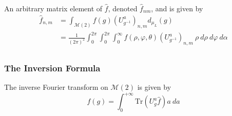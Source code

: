 \documentclass{article}
\begin{document}
\begin{define}
    An arbitrary matrix element of $\hat{f}$, denoted $\hat{f}_{nm}$, and is given by
    \[%
        \begin{split}
            \hat{f}_{n,m} &= \int_{\mathcal{M}(2)} f(g) (U^{a}_{g^{-1}})_{n,m} d_{\mu_{L}}(g)  \\
                         &= \frac{1}{(2\pi)^{2}} \int^{2\pi}_{0}\int^{2\pi}_{0}\int^{\infty}_{0} f(\rho, \varphi, \theta) (U^{a}_{g^{-1}})_{n,m} \ \rho \ d\rho \ d\varphi \ d\alpha \\
        \end{split}
    \]%
\end{define}

\subsubsection{The Inversion Formula} 

\begin{define}
    The inverse Fourier transform on $\mathcal{M}(2)$  is given by
    \[%
        f(g) = \int^{+\infty}_{0} \text{Tr}\left(U^{a}_{g}\hat{f}\right) a \ da
    \]
\end{define}
\end{document}
